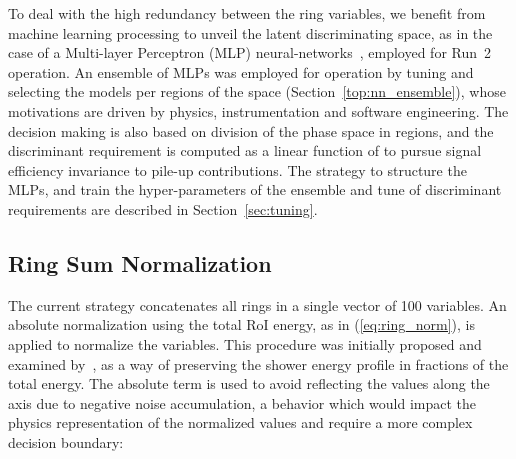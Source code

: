 To deal with the high redundancy between the ring variables, we benefit from machine learning processing to unveil the latent discriminating space, as in
the case of a Multi-layer Perceptron (MLP) neural-networks~\cite{haykin_2008},
employed for Run~2 operation. 
An ensemble of MLPs was employed for operation by tuning and selecting
the models per regions of the \eteta space (Section~\ref{top:nn_ensemble}), whose
motivations are driven by physics, instrumentation and software 
engineering. The \rnn
decision making is also based on division of the phase space in regions, and the discriminant requirement is
computed as a linear function of \avgmu to pursue signal efficiency invariance
to pile-up contributions. 
The strategy to structure the MLPs,  and train the hyper-parameters of the ensemble and tune of discriminant requirements 
are described in Section~\ref{sec:tuning}.


%

\subsection{Ring Sum Normalization}\label{top:pp}

The current strategy concatenates all rings in a single vector of 100
variables. An absolute normalization using the total RoI energy, as in
(\ref{eq:ring_norm}), is applied to normalize the variables. This procedure was
initially proposed and examined by~\cite{1995_seixas_ringer}, as a way of
preserving the shower energy profile in fractions of the total energy. The
absolute term is used to avoid reflecting the values along the axis due to
negative noise accumulation, a behavior which would impact the physics
representation of the normalized values and require a more complex decision
boundary:

